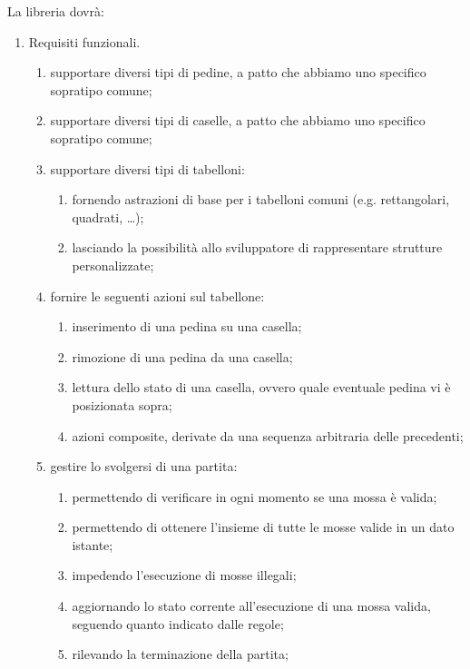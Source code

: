 La libreria dovrà:
%
\begin{enumerate}[resume]
    \item Requisiti funzionali.
    \begin{enumerate}[label*=\arabic*.]
        \item supportare diversi tipi di pedine, a patto che abbiamo uno specifico sopratipo comune;
        \item supportare diversi tipi di caselle, a patto che abbiamo uno specifico sopratipo comune;
        \item \label{req:board_state} supportare diversi tipi di tabelloni:
        \begin{enumerate}[label*=\arabic*.]
            \item fornendo astrazioni di base per i tabelloni comuni (e.g. rettangolari, quadrati, \dots);
            \item lasciando la possibilità allo sviluppatore di rappresentare strutture personalizzate;
        \end{enumerate}
        \item fornire le seguenti azioni sul tabellone:
        \begin{enumerate}[label*=\arabic*.]
            \item inserimento di una pedina su una casella;
            \item rimozione di una pedina da una casella;
            \item lettura dello stato di una casella, ovvero quale eventuale pedina vi è posizionata sopra;
            \item azioni composite, derivate da una sequenza arbitraria delle precedenti;
        \end{enumerate}
        \item gestire lo svolgersi di una partita:
        \begin{enumerate}[label*=\arabic*.]
            \item permettendo di verificare in ogni momento se una mossa è valida;
            \item permettendo di ottenere l'insieme di tutte le mosse valide in un dato istante; 
            \item impedendo l'esecuzione di mosse illegali;
            \item aggiornando lo stato corrente all'esecuzione di una mossa valida, seguendo quanto indicato dalle regole;
            \item \label{req:end_game_cond} rilevando la terminazione della partita;

\end{enumerate}
\end{enumerate}
\end{enumerate}
